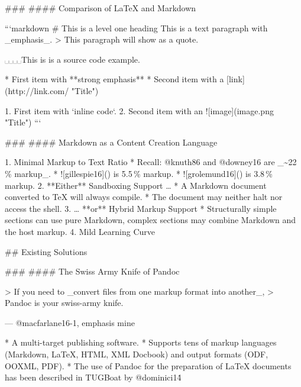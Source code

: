 \documentclass{beamer}
\begin{document}
\begin{darkframes}
\begin{frame}
\end{frame}
\begin{frame}

### \subsecname
#### Comparison of \LaTeX{} and Markdown

```markdown
# This is a level one heading
This is a text paragraph with _emphasis_.
> This paragraph will show as a quote.

␣␣␣␣This is is a source code example.

* First item with **strong emphasis**
* Second item with a [link](http://link.com/ "Title")

1. First item with `inline code`.
2. Second item with an ![image](image.png "Title")
```

\end{frame}
\begin{frame}

### \subsecname
#### Markdown as a Content Creation Language

  1. Minimal Markup to Text Ratio
    * Recall: @knuth86 and @downey16 are _\textasciitilde 22\,\% markup_.
    * ![gillespie16]() is 5.5\,\% markup.
    * ![grolemund16]() is 3.8\,\% markup.
  2. **Either** Sandboxing Support …
    * A Markdown document converted to \TeX{} will always compile.
    * The document may neither halt nor access the shell.
  3. … **or** Hybrid Markup Support
    * Structurally simple sections can use pure Markdown, complex sections
      may combine Markdown and the host markup.
  4. Mild Learning Curve

\end{frame}

## Existing Solutions

\begin{frame}

### \subsecname
#### The Swiss Army Knife of Pandoc

> If you need to _convert files from one markup format into another_,
> Pandoc is your swiss-army knife.

\hfill --- @macfarlane16-1, emphasis mine

  * A multi-target publishing software.
  * Supports tens of markup languages (Markdown, \LaTeX, HTML, XML Docbook)
    and output formats (ODF, OOXML, PDF).
  * The use of Pandoc for the preparation of \LaTeX{} documents has been
    described in TUGBoat by @dominici14\.


\end{frame}
\end{darkframes}
\end{document}

